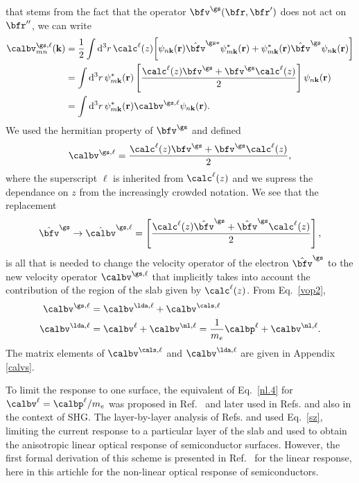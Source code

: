 \documentclass[floatfix,prb,aps,superscriptaddress,11pt,preprint,letterpaper]{revtex4}
\begin{document}
that stems from the fact that the operator $\bfv^\gs(\bfr,\bfr')$ does not act on
$\bfr''$, we can write
\begin{align}\label{nl.3}
\calbv^{\gs,\ell}_{mn}({\mathbf k})
&=
\frac{1}{2}
\int \mathrm{d}^3 r\,
 \calc^\ell(z)
 \bigg[
\psi_{n\mathbf{k}}(\mathbf{r})
\hat\bfv^{\gs *}\psi^*_{m\mathbf{k}}(\mathbf{r})
+ 
\psi^*_{m\mathbf{k}}(\mathbf{r})\hat\bfv^\gs
\psi_{n\mathbf{k}}(\mathbf{r})
\bigg]
\nonumber\\
&=
\int \mathrm{d}^3 r\,
\psi^*_{m\mathbf{k}}(\mathbf{r})
\left[\frac{\calc^\ell(z) \bfv^\gs +
\bfv^\gs \calc^\ell(z)}{2}\right]
\psi_{n\mathbf{k}}(\mathbf{r})
\nonumber\\
&=
\int \mathrm{d}^3 r\,
\psi^*_{m\mathbf{k}}(\mathbf{r})
\calbv^{\gs,\ell}
\psi_{n\mathbf{k}}(\mathbf{r})
.
\end{align}
We used the hermitian property of $\bfv^\gs$ and defined
\begin{align}\label{nl.4}
\calbv^{\gs,\ell}
=
\frac{\calc^\ell(z) \bfv^\gs +
\bfv^\gs \calc^\ell(z)}{2}
,
\end{align} 
where the superscript $\ell$ is inherited from $\calc^\ell(z)$ and we
supress the dependance on $z$ from the increasingly crowded notation.  
We see that the replacement
\begin{align}\label{vcali}
\hat\bfv^\gs \to \hat\calbv^{\gs,\ell}=\left[\frac{\calc^\ell(z) \hat\bfv^\gs +
\hat\bfv^\gs \calc^\ell(z)}{2}\right]
,
\end{align} 
is all that is needed to change the
velocity operator of the electron $\hat\bfv^\gs$ to the new velocity
operator $\calbv^{\gs,\ell}$ that implicitly takes into account the
contribution of the region of the slab given by $\calc^\ell(z)$.
From Eq.~\eqref{vop2},
\begin{align}\label{vopii}
\calbv^{\gs,\ell}
&=
\calbv^{\lda,\ell}
+
\calbv^{\cals,\ell}
\nonumber\\
\calbv^{\lda,\ell}
&=
\calbv^{\ell}
+
\calbv^{\nl,\ell}
=
\frac{1}{m_e}
\calbp^{\ell}
+
\calbv^{\nl,\ell}
.
\end{align}
The matrix elements of $\calbv^{\cals,\ell}$ and $\calbv^{\lda,\ell}$
are given in 
Appendix \ref{calvs}.

To limit the response to one surface, the equivalent of Eq.~\eqref{nl.4} 
for $\calbv^\ell=\calbp^\ell/m_e$ was proposed in 
Ref.~ and later used in Refs.
 and  
also in the context of SHG. 
The layer-by-layer analysis of Refs.  
and  used Eq.~\eqref{sz}, 
limiting the current response
to a particular layer of the slab and used to obtain the
anisotropic linear optical response of semiconductor surfaces.
However, the first formal derivation of this scheme is presented in
Ref.~ for the linear response, here in this 
artichle for the non-linear optical response of semiconductors.
\end{document}

